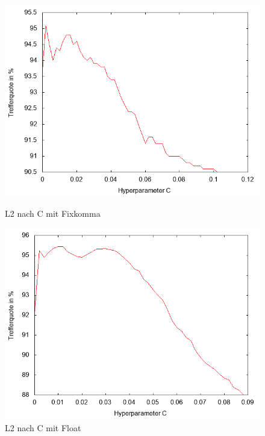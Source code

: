 \begin{figure}[ht]
\centering
	\begin{minipage}[b]{.45\linewidth}
  		\includegraphics[scale=0.4]{bilder/pareto_l2_MNIST}
  		\caption{L2 nach C mit Fixkomma}
  	\end{minipage}
  	\hspace{.05\linewidth}%
  	\begin{minipage}[b]{.45\linewidth}
  		\includegraphics[scale=0.4]{bilder/pareto_l2_float_single}
		\caption{L2 nach C mit Float}
	\end{minipage}
	\hspace{.05\linewidth}%
\end{figure}
